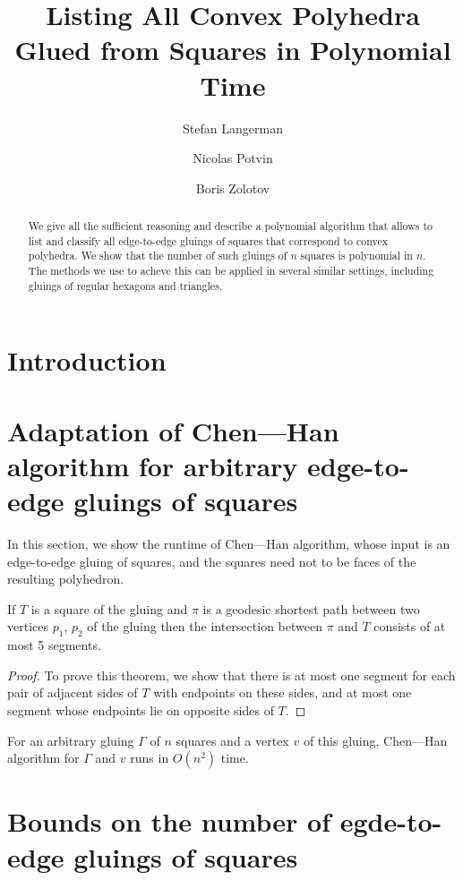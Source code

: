 \documentclass[a4paper,USenglish,cleveref, autoref, thm-restate]{socg-lipics-v2019}
\title{Listing All Convex Polyhedra Glued from Squares in Polynomial Time}
\author{Stefan Langerman}{Faculté des Sciences, Université Libre de Bruxelles}{stefan.langerman@ulb.ac.be}{ }{Whatever grant}
\author{Nicolas Potvin}{Faculté des Sciences, Université Libre de Bruxelles}{potvinnicolas2@gmail.com}{ }{Whatever grant}
\author{Boris Zolotov}{Department of Mathematics and Computer Sciences, St. Petersburg State University}{boris.a.zolotov@yandex.com}{ }{Whatever grant}
\begin{document}
\maketitle

\begin{abstract}We give all the sufficient reasoning and describe a polynomial algorithm that allows to list and classify all edge-to-edge gluings of squares that correspond to convex polyhedra. We show that the number of such gluings of $n$ squares is polynomial in $n$. The methods we use to acheve this can be applied in several similar settings, including gluings of regular hexagons and triangles.\end{abstract}

\section{Introduction}

\section{Adaptation of Chen—Han algorithm for arbitrary edge-to-edge gluings of squares}

In this section, we show the runtime of Chen—Han algorithm, whose input is an edge-to-edge gluing of squares, and the squares need not to be faces of the resulting polyhedron.

\begin{theorem} \label{thm:shortestSquare}
	If $T$ is a square of the gluing and $\pi$ is a geodesic shortest path between two vertices $p_1$, $p_2$ of the gluing then the intersection between $\pi$ and $T$ consists of at most 5 segments.
\end{theorem}

\begin{proof}
	To prove this theorem, we show that there is at most one segment for each pair of adjacent sides of $T$ with endpoints on these sides, and at most one segment whose endpoints lie on opposite sides of $T$.
\end{proof}

\begin{corollary} \label{cor:chruntime}
	For an arbitrary gluing $\Gamma$ of $n$ squares and a vertex $v$ of this gluing, Chen—Han algorithm for $\Gamma$ and $v$ runs in $O(n^2)$ time.
\end{corollary}

\section{Bounds on the number of egde-to-edge gluings of squares}
\end{document}
